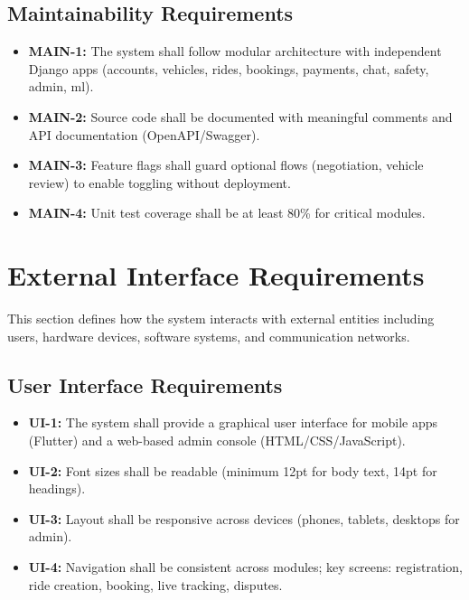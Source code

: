 \subsection{Maintainability Requirements}
\begin{itemize}
\item \textbf{MAIN-1:} The system shall follow modular architecture with independent Django apps (accounts, vehicles, rides, bookings, payments, chat, safety, admin, ml).
\item \textbf{MAIN-2:} Source code shall be documented with meaningful comments and API documentation (OpenAPI/Swagger).
\item \textbf{MAIN-3:} Feature flags shall guard optional flows (negotiation, vehicle review) to enable toggling without deployment.
\item \textbf{MAIN-4:} Unit test coverage shall be at least 80\% for critical modules.
\end{itemize}

\section{External Interface Requirements}

This section defines how the system interacts with external entities including users, hardware devices, software systems, and communication networks.

\subsection{User Interface Requirements}
\begin{itemize}
\item \textbf{UI-1:} The system shall provide a graphical user interface for mobile apps (Flutter) and a web-based admin console (HTML/CSS/JavaScript).
\item \textbf{UI-2:} Font sizes shall be readable (minimum 12pt for body text, 14pt for headings).
\item \textbf{UI-3:} Layout shall be responsive across devices (phones, tablets, desktops for admin).
\item \textbf{UI-4:} Navigation shall be consistent across modules; key screens: registration, ride creation, booking, live tracking, disputes.
\end{itemize}

